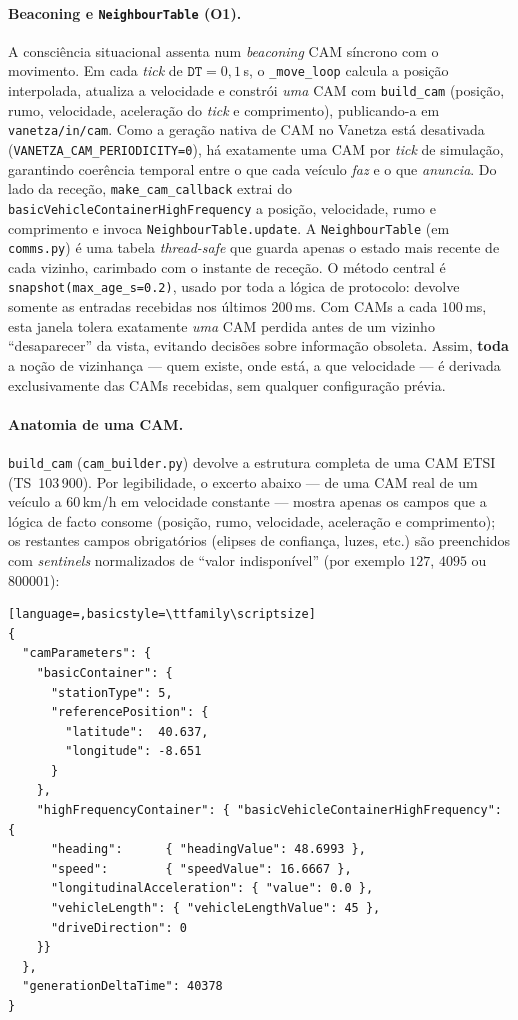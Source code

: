 \documentclass[11pt,a4paper]{article}
\begin{document}
\paragraph{Beaconing e \texttt{NeighbourTable} (O1).} A consciência situacional assenta num
\emph{beaconing} CAM síncrono com o movimento. Em cada \emph{tick} de $\texttt{DT}=0{,}1$\,s,
o \texttt{\_move\_loop} calcula a posição interpolada, atualiza a velocidade e constrói
\emph{uma} CAM com \texttt{build\_cam} (posição, rumo, velocidade, aceleração do \emph{tick}
e comprimento), publicando-a em \texttt{vanetza/in/cam}. Como a geração nativa de CAM no
Vanetza está desativada (\texttt{VANETZA\_CAM\_PERIODICITY=0}), há exatamente uma CAM por
\emph{tick} de simulação, garantindo coerência temporal entre o que cada veículo \emph{faz}
e o que \emph{anuncia}. Do lado da receção, \texttt{make\_cam\_callback} extrai do
\texttt{basicVehicleContainer\-HighFrequency} a posição, velocidade, rumo e comprimento e
invoca \texttt{NeighbourTable.update}. A \texttt{NeighbourTable} (em \texttt{comms.py}) é uma
tabela \emph{thread-safe} que guarda apenas o estado mais recente de cada vizinho, carimbado
com o instante de receção. O método central é \texttt{snapshot(max\_age\_s=0.2)}, usado por
toda a lógica de protocolo: devolve somente as entradas recebidas nos últimos $200$\,ms. Com
CAMs a cada $100$\,ms, esta janela tolera exatamente \emph{uma} CAM perdida antes de um
vizinho ``desaparecer'' da vista, evitando decisões sobre informação obsoleta. Assim,
\textbf{toda} a noção de vizinhança --- quem existe, onde está, a que velocidade --- é
derivada exclusivamente das CAMs recebidas, sem qualquer configuração prévia.

\paragraph{Anatomia de uma CAM.} \texttt{build\_cam} (\texttt{cam\_builder.py}) devolve a
estrutura completa de uma CAM ETSI (TS~103\,900). Por legibilidade, o excerto abaixo --- de
uma CAM real de um veículo a $60$\,km/h em velocidade constante --- mostra apenas os campos
que a lógica de facto consome (posição, rumo, velocidade, aceleração e comprimento); os
restantes campos obrigatórios (elipses de confiança, luzes, etc.) são preenchidos com
\emph{sentinels} normalizados de ``valor indisponível'' (por exemplo $127$, $4095$ ou
$800001$):

\begin{lstlisting}[language=,basicstyle=\ttfamily\scriptsize]
{
  "camParameters": {
    "basicContainer": {
      "stationType": 5,
      "referencePosition": {
        "latitude":  40.637,
        "longitude": -8.651
      }
    },
    "highFrequencyContainer": { "basicVehicleContainerHighFrequency": {
      "heading":      { "headingValue": 48.6993 },
      "speed":        { "speedValue": 16.6667 },
      "longitudinalAcceleration": { "value": 0.0 },
      "vehicleLength": { "vehicleLengthValue": 45 },
      "driveDirection": 0
    }}
  },
  "generationDeltaTime": 40378
}
\end{lstlisting}
\end{document}
